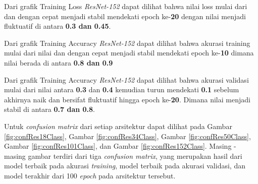 Dari grafik Training Loss \emph{ResNet-152} dapat dilihat bahwa nilai loss mulai dari \textbf{} dan dengan cepat menjadi stabil mendekati epoch ke-\textbf{20} dengan nilai menjadi fluktuatif di antara \textbf{0.3 dan 0.45}.

Dari grafik Training Accuracy \emph{ResNet-152} dapat dilihat bahwa akurasi training mulai dari nilai \textbf{} dan dengan cepat menjadi stabil mendekati epoch ke-\textbf{10} dimana nilai berada di antara \textbf{0.8 dan 0.9} 

Dari grafik Training Accuracy \emph{ResNet-152} dapat dilihat bahwa akurasi validasi mulai dari nilai antara \textbf{0.3} dan \textbf{0.4} kemudian turun mendekati \textbf{0.1} sebelum akhirnya naik dan bersifat fluktuatif hingga epoch ke-\textbf{20}. Dimana nilai menjadi stabil di antara \textbf{0.7 dan 0.8}.

Untuk \emph{confusion matrix} dari setiap arsitektur dapat dilihat pada Gambar \ref{fig:confRes18Class}, Gambar \ref{fig:confRes34Class}, Gambar \ref{fig:confRes50Class}, Gambar \ref{fig:confRes101Class}, dan Gambar \ref{fig:confRes152Class}. Masing - masing gambar terdiri dari tiga \emph{confusion matrix}, yang merupakan hasil dari model terbaik pada akurasi \emph{training}, model terbaik pada akurasi validasi, dan model terakhir dari 100 \emph{epoch} pada arsitektur tersebut.

